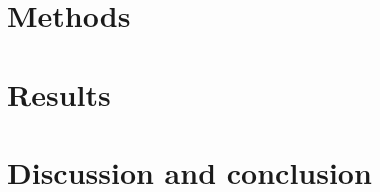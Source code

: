 \documentclass[a4paper, 11pt]{article} %
\newcommand{\Acknowledgments}{%
This work was supported by XXX and the Doc2Amu project which received funding from a co-fund with the European Union's Horizon 2020 research and innovation programme and the region Provence Alpes Cote d'Azur. }
\begin{document}
\section{Methods}\label{methods}


\section{Results}\label{results}


\section{Discussion and conclusion}\label{discussion-et-conclusion}



\printbibliography
\end{document}
